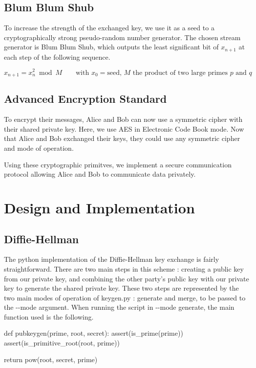 \documentclass{article}
\begin{document}
\subsection{Blum Blum Shub}

To increase the strength of the exchanged key, we use it as a seed to a cryptographically strong pseudo-random number generator. The chosen stream generator is Blum Blum Shub\cite{Blum1986}, which outputs the least significant bit of $x_{{n+1}}$ at each step of the following sequence.

\begin{equation*}
    x_{n+1}=x_{n}^{2} \bmod M
    \quad \quad \text{with $x_{0} = \text{seed}$, $M$ the product of two large primes $p$ and $q$}
\end{equation*}

\subsection{Advanced Encryption Standard}

To encrypt their messages, Alice and Bob can now use a symmetric cipher with their shared private key. Here, we use AES in Electronic Code Book mode. Now that Alice and Bob exchanged their keys, they could use any symmetric cipher and mode of operation. 

Using these cryptographic primitves, we implement a secure communication protocol allowing Alice and Bob to communicate data privately.

\section{Design and Implementation}

\subsection{Diffie-Hellman}

The python implementation of the Diffie-Hellman key exchange is fairly straightforward. There are two main steps in this scheme : creating a public key from our private key, and combining the other party's public key with our private key to generate the shared private key. These two steps are represented by the two main modes of operation of keygen.py : generate and merge, to be passed to the -{}-mode argument. When running the script in -{}-mode generate, the main function used is the following.

\bigskip
\begin{python}
def pubkeygen(prime, root, secret):
    assert(is_prime(prime))
    assert(is_primitive_root(root, prime))

    return pow(root, secret, prime)
\end{python}
\bigskip
\end{document}
